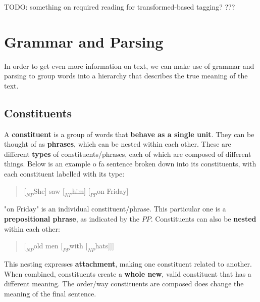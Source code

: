 \documentclass{article}
\begin{document}
TODO: something on required reading for transformed-based tagging?
???

\section{Grammar and Parsing}

In order to get even more information on text, we can make use of grammar and parsing to group words into a hierarchy that describes the true meaning of the text. 

\subsection{Constituents}

A \textbf{constituent} is a group of words that \textbf{behave as a single unit}. They can be thought of as \textbf{phrases}, which can be nested within each other. These are different \textbf{types} of constituents/phrases, each of which are composed of different things. Below is an example o fa sentence broken down into its constituents, with each constituent labelled with its type:
\begin{quote}
	$[_{NP}$She] saw $[_{NP}$him] $[_{PP}$on Friday]
\end{quote}
"on Friday" is an individual constituent/phrase. This particular one is a \textbf{prepositional phrase}, as indicated by the $PP$. Constituents can also be \textbf{nested} within each other:
\begin{quote}
	$[_{NP}$old men $[_{PP}$with $[_{NP}$hats]]]
\end{quote}
This nesting expresses \textbf{attachment}, making one constituent related to another. When combined, constituents create a \textbf{whole new}, valid constituent that has a different meaning. The order/way constituents are composed does change the meaning of the final sentence.
\end{document}
